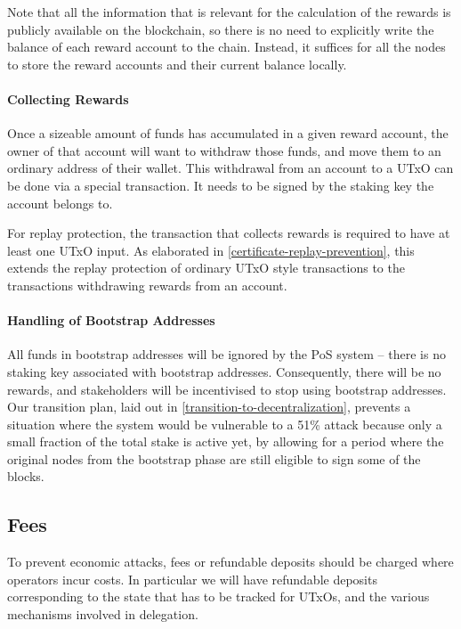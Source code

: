 \documentclass[11pt,a4paper]{article}
\begin{document}
Note that all the information that is relevant for the calculation of
the rewards is publicly available on the blockchain, so there is no
need to explicitly write the balance of each reward account to the
chain. Instead, it suffices for all the nodes to store the reward
accounts and their current balance locally.

\paragraph{Collecting Rewards}

Once a sizeable amount of funds has accumulated in a given reward
account, the owner of that account will want to withdraw those funds,
and move them to an ordinary address of their wallet. This withdrawal
from an account to a UTxO can be done via a special transaction. It
needs to be signed by the staking key the account belongs to.

For replay protection, the transaction that collects rewards is required to have
at least one UTxO input. As elaborated in \cref{certificate-replay-prevention},
this extends the replay protection of ordinary UTxO style transactions to the
transactions withdrawing rewards from an account.

\paragraph{Handling of Bootstrap Addresses}
\label{handling-of-bootstrap-addresses}

All funds in bootstrap addresses will be ignored by the PoS system --
there is no staking key associated with bootstrap
addresses. Consequently, there will be no rewards, and stakeholders
will be incentivised to stop using bootstrap addresses. Our transition
plan, laid out in \cref{transition-to-decentralization}, prevents a
situation where the system would be vulnerable to a 51\% attack
because only a small fraction of the total stake is active yet, by
allowing for a period where the original nodes from the bootstrap
phase are still eligible to sign some of the blocks.

\subsection{Fees}
\label{fees}

To prevent economic attacks, fees or refundable deposits should be
charged where operators incur costs. In particular we will have
refundable deposits corresponding to the state that has to be tracked
for UTxOs, and the various mechanisms involved in delegation.
\end{document}
